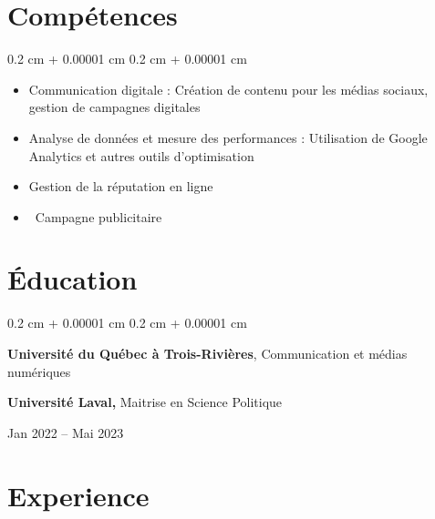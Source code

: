 \documentclass[10pt, letterpaper]{article}
\newenvironment{highlights}{
    \begin{itemize}[
        topsep=0.10 cm,
        parsep=0.10 cm,
        partopsep=0pt,
        itemsep=0pt,
        leftmargin=0.4 cm + 10pt
    ]
}{
    \end{itemize}
} %
\newenvironment{highlightsforbulletentries}{
    \begin{itemize}[
        topsep=0.10 cm,
        parsep=0.10 cm,
        partopsep=0pt,
        itemsep=0pt,
        leftmargin=10pt
    ]
}{
    \end{itemize}
} %
\newenvironment{onecolentry}{
    \begin{adjustwidth}{
        0.2 cm + 0.00001 cm
    }{
        0.2 cm + 0.00001 cm
    }
}{
    \end{adjustwidth}
} %
\newenvironment{threecolentry}[3][]{
    \onecolentry
    \def\thirdColumn{#3}
    \setcolumnwidth{1 cm, \fill, 4.5 cm}
    \begin{paracol}{3}
    {\raggedright #2} \switchcolumn
}{
    \switchcolumn \raggedleft \thirdColumn
    \end{paracol}
    \endonecolentry
} %
\begin{document}
    
    \section{Compétences}

    \begin{onecolentry}
        \begin{highlightsforbulletentries}


        \item Communication digitale : Création de contenu pour les médias sociaux, gestion de campagnes digitales 

        \item  Analyse de données et mesure des performances : Utilisation de Google Analytics et autres outils d’optimisation

        \item Gestion de la réputation en ligne

        \item \ Campagne publicitaire 


        \end{highlightsforbulletentries}
    \end{onecolentry}

    \section{Éducation}



        
        \begin{threecolentry}{\textbf{}}{
            Jan 2022 – Mai 2023
        }
            \textbf{Université du Québec à Trois-Rivières}, Communication et médias numériques
            \begin{highlights}
     \textbf{Université Laval,} Maitrise en Science Politique
            \end{highlights}
        \end{threecolentry}


    
    \section{Experience}
\end{document}
